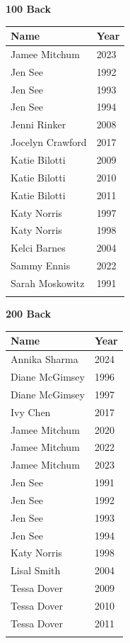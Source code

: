 \noindent\begin{minipage}[t]{0.48\textwidth}
\centering
\textbf{\textcolor{teamprimary}{100 Back}}\par
\vspace{0.5em}
\centering
\small
\renewcommand{\arraystretch}{1.0}
\setlength{\tabcolsep}{4pt}
\begin{tabular}{@{}p{3.0cm}p{1.0cm}@{}}
\toprule
\textbf{Name} & \textbf{Year} \\
\midrule
Jamee Mitchum & 2023 \\
Jen See & 1992 \\
Jen See & 1993 \\
Jen See & 1994 \\
Jenni Rinker & 2008 \\
Jocelyn Crawford & 2017 \\
Katie Bilotti & 2009 \\
Katie Bilotti & 2010 \\
Katie Bilotti & 2011 \\
Katy Norris & 1997 \\
Katy Norris & 1998 \\
Kelci Barnes & 2004 \\
Sammy Ennis & 2022 \\
Sarah Moskowitz & 1991 \\
\bottomrule
\vspace{0.5em}
\end{tabular}
\end{minipage}
\hfill
\begin{minipage}[t]{0.48\textwidth}
\centering
\textbf{\textcolor{teamprimary}{200 Back}}\par
\vspace{0.5em}
\centering
\small
\renewcommand{\arraystretch}{1.0}
\setlength{\tabcolsep}{4pt}
\begin{tabular}{@{}p{3.0cm}p{1.0cm}@{}}
\toprule
\textbf{Name} & \textbf{Year} \\
\midrule
Annika Sharma & 2024 \\
Diane McGimsey & 1996 \\
Diane McGimsey & 1997 \\
Ivy Chen & 2017 \\
Jamee Mitchum & 2020 \\
Jamee Mitchum & 2022 \\
Jamee Mitchum & 2023 \\
Jen See & 1991 \\
Jen See & 1992 \\
Jen See & 1993 \\
Jen See & 1994 \\
Katy Norris & 1998 \\
Lisal Smith & 2004 \\
Tessa Dover & 2009 \\
Tessa Dover & 2010 \\
Tessa Dover & 2011 \\
\bottomrule
\vspace{0.5em}
\end{tabular}
\end{minipage}

